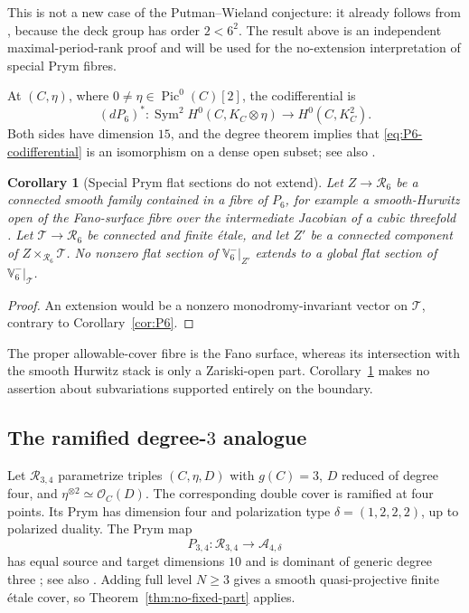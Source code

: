 \documentclass[11pt,reqno]{amsart}
\numberwithin{equation}{section}
\newtheorem{corollary}[theorem]{Corollary}
\theoremstyle{definition}
\theoremstyle{remark}
\newcommand{\OO}{\mathcal O}
\newcommand{\cA}{\mathcal A}
\newcommand{\cR}{\mathcal R}
\newcommand{\Pic}{\operatorname{Pic}}
\newcommand{\Sym}{\operatorname{Sym}}
\begin{document}
This is not a new case of the Putman--Wieland conjecture: it already follows from \cite[Theorem~1.2]{LandesmanLitt2023}, because the deck group has order $2<6^2$.  The result above is an independent maximal-period-rank proof and will be used for the no-extension interpretation of special Prym fibres.

At $(C,\eta)$, where $0\ne\eta\in\Pic^0(C)[2]$, the codifferential is
\begin{equation}\label{eq:P6-codifferential}
(dP_6)^*:\Sym^2H^0(C,K_C\otimes\eta)
\longrightarrow H^0(C,K_C^2).
\end{equation}
Both sides have dimension $15$, and the degree theorem implies that \eqref{eq:P6-codifferential} is an isomorphism on a dense open subset; see also \cite[Proposition~7.5]{Beauville1977}.

\begin{corollary}[Special Prym flat sections do not extend]\label{cor:no-thickening}
Let $Z\to\cR_6$ be a connected smooth family contained in a fibre of $P_6$, for example a smooth-Hurwitz open of the Fano-surface fibre over the intermediate Jacobian of a cubic threefold \cite[Theorem~4.1]{CasalainaMartinZhang2021}.  Let $\mathscr T\to\cR_6$ be connected and finite \'etale, and let $Z'$ be a connected component of $Z\times_{\cR_6}\mathscr T$.  No nonzero flat section of $\mathbb V_6^-|_{Z'}$ extends to a global flat section of $\mathbb V_6^-|_{\mathscr T}$.
\end{corollary}

\begin{proof}
An extension would be a nonzero monodromy-invariant vector on $\mathscr T$, contrary to Corollary~\ref{cor:P6}.
\end{proof}

The proper allowable-cover fibre is the Fano surface, whereas its intersection with the smooth Hurwitz stack is only a Zariski-open part.  Corollary~\ref{cor:no-thickening} makes no assertion about subvariations supported entirely on the boundary.

\subsection{The ramified degree-\texorpdfstring{$3$}{3} analogue}

Let $\cR_{3,4}$ parametrize triples $(C,\eta,D)$ with $g(C)=3$, $D$ reduced of degree four, and
$\eta^{\otimes2}\simeq\OO_C(D)$.  The corresponding double cover is ramified at four points.  Its Prym has dimension four and polarization type $\delta=(1,2,2,2)$, up to polarized duality.  The Prym map
\[
P_{3,4}:\cR_{3,4}\longrightarrow\cA_{4,\delta}
\]
has equal source and target dimensions $10$ and is dominant of generic degree three \cite{NagarajRamanan1995,BardelliCilibertoVerra1995}; see also \cite[Corollary~0.3]{CasalainaMartinZhang2021}.  Adding full level $N\ge3$ gives a smooth quasi-projective finite \'etale cover, so Theorem~\ref{thm:no-fixed-part} applies.
\end{document}
